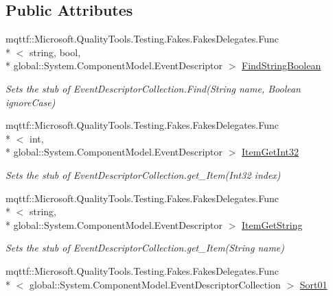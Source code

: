 \subsection*{Public Attributes}
\begin{DoxyCompactItemize}
\item 
mqttf\-::\-Microsoft.\-Quality\-Tools.\-Testing.\-Fakes.\-Fakes\-Delegates.\-Func\\*
$<$ string, bool, \\*
global\-::\-System.\-Component\-Model.\-Event\-Descriptor $>$ \hyperlink{class_system_1_1_component_model_1_1_fakes_1_1_stub_event_descriptor_collection_af092cf52e27bd09029a642e2c94b8853}{Find\-String\-Boolean}
\begin{DoxyCompactList}\small\item\em Sets the stub of Event\-Descriptor\-Collection.\-Find(\-String name, Boolean ignore\-Case)\end{DoxyCompactList}\item 
mqttf\-::\-Microsoft.\-Quality\-Tools.\-Testing.\-Fakes.\-Fakes\-Delegates.\-Func\\*
$<$ int, \\*
global\-::\-System.\-Component\-Model.\-Event\-Descriptor $>$ \hyperlink{class_system_1_1_component_model_1_1_fakes_1_1_stub_event_descriptor_collection_a0ddaa1be93c062dc555135f844e35af0}{Item\-Get\-Int32}
\begin{DoxyCompactList}\small\item\em Sets the stub of Event\-Descriptor\-Collection.\-get\-\_\-\-Item(\-Int32 index)\end{DoxyCompactList}\item 
mqttf\-::\-Microsoft.\-Quality\-Tools.\-Testing.\-Fakes.\-Fakes\-Delegates.\-Func\\*
$<$ string, \\*
global\-::\-System.\-Component\-Model.\-Event\-Descriptor $>$ \hyperlink{class_system_1_1_component_model_1_1_fakes_1_1_stub_event_descriptor_collection_a6c0d579f0674086e30d2df90c0611e51}{Item\-Get\-String}
\begin{DoxyCompactList}\small\item\em Sets the stub of Event\-Descriptor\-Collection.\-get\-\_\-\-Item(\-String name)\end{DoxyCompactList}\item 
mqttf\-::\-Microsoft.\-Quality\-Tools.\-Testing.\-Fakes.\-Fakes\-Delegates.\-Func\\*
$<$ global\-::\-System.\-Component\-Model.\-Event\-Descriptor\-Collection $>$ \hyperlink{class_system_1_1_component_model_1_1_fakes_1_1_stub_event_descriptor_collection_a6b628640a0115e0e22d474ffbcd56114}{Sort01}

\end{DoxyCompactItemize}
